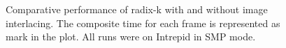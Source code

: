 \documentclass{acm_proc_article-sp}
\begin{document}
\begin{figure}[htbp]
  \centering
  \hfill
  \caption{Comparative performance of radix-k with and without image
    interlacing.  The composite time for each frame is represented as mark
    in the plot.  All runs were on Intrepid in SMP mode.}
  \label{fig:InterlacePerformance}
\end{figure}
\end{document}
